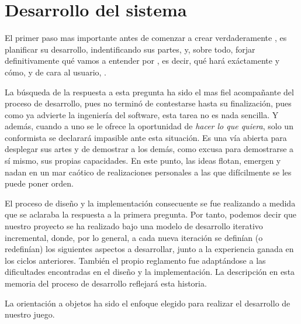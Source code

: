 %


\chapter{Desarrollo del sistema}
\label{chap:desarrollo}

El primer paso mas importante antes de comenzar a crear verdaderamente
\gomf, es planificar su desarrollo, indentificando sus partes, y,
sobre todo, forjar definitivamente qué vamos a entender por \gomf, es
decir, qué hará exáctamente y cómo, y de cara al usuario, \gomf.

La búsqueda de la respuesta a esta pregunta ha sido el mas fiel
acompañante del proceso de desarrollo, pues no terminó de contestarse
hasta su finalización, pues como ya advierte la ingeniería del software, esta
tarea no es nada sencilla. Y además, cuando a uno se le ofrece la
oportunidad de \emph{hacer lo que  quiera}, solo un conformista se
declarará impasible ante esta situación. Es una vía abierta para
desplegar sus artes y de demostrar a los demás, como excusa para
demostrarse a sí mismo, sus propias capacidades. En este punto, las
ideas flotan, emergen y nadan en un mar caótico de realizaciones
personales a las que difícilmente se les puede poner orden.

El proceso de diseño y la implementación consecuente se fue realizando
a medida que se aclaraba la respuesta a la primera pregunta. Por
tanto, podemos decir que nuestro proyecto se ha realizado bajo una
modelo de desarrollo iterativo incremental, donde, por lo general, a
cada nueva iteración se definían (o redefinían) los siguientes
aspectos a desarrollar, junto a la experiencia ganada en los ciclos
anteriores. También el propio reglamento fue adaptándose a las
dificultades encontradas en el diseño y la implementación. La
descripción en esta memoria del proceso de desarrollo reflejará esta
historia.

La orientación a objetos ha sido el enfoque elegido para realizar el
desarrollo de nuestro juego.

\newpage

\cleardoublepage


\cleardoublepage


\cleardoublepage


\cleardoublepage


\cleardoublepage

